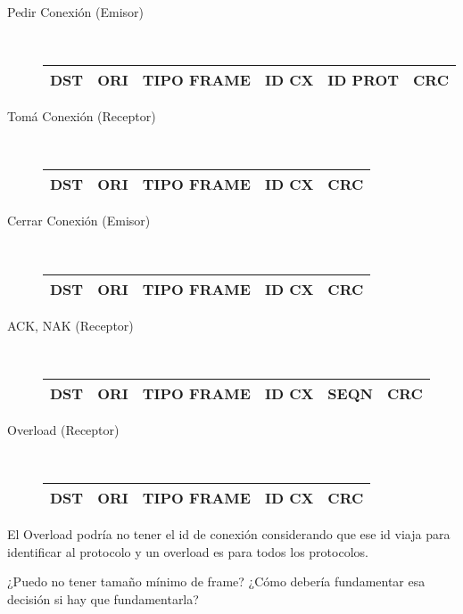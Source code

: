 \documentclass[a4paper,10pt]{article}
\begin{document}
\begin{description}
\item[Pedir Conexión (Emisor)]\ \\
\begin{tabular}{|c|c|c|c|c|c|}\hline
	DST & ORI & TIPO FRAME & ID CX & ID PROT & CRC\\\hline
\end{tabular}

\item[Tomá Conexión (Receptor)]\ \\
\begin{tabular}{|c|c|c|c|c|}\hline
	DST & ORI & TIPO FRAME & ID CX & CRC\\\hline
\end{tabular}

\item[Cerrar Conexión (Emisor)]\ \\
\begin{tabular}{|c|c|c|c|c|}\hline
	 DST & ORI & TIPO FRAME & ID CX & CRC \\\hline
\end{tabular}

\item[ACK, NAK (Receptor)]\ \\
\begin{tabular}{|c|c|c|c|c|c|}\hline
	DST & ORI & TIPO FRAME & ID CX & SEQN & CRC\\\hline
\end{tabular}

\item[Overload (Receptor)]\ \\
\begin{tabular}{|c|c|c|c|c|}\hline
	DST & ORI & TIPO FRAME & ID CX & CRC\\\hline
\end{tabular}

\end{description}

El Overload podría no tener el id de conexión considerando que ese id viaja para identificar al protocolo y un overload es para todos los protocolos.

¿Puedo no tener tamaño mínimo de frame? ¿Cómo debería fundamentar esa decisión si hay que fundamentarla?
\end{document}
